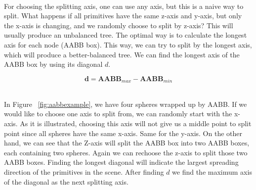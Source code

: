 \documentclass[11pt,a4paper]{article}
\begin{document}
\noindent
\\
For choosing the splitting axis, one can use any axis, but this is a naive way to split. What happens if all primitives have the same z-axis and y-axis, but only the x-axis is changing, and we randomly choose to split by z-axis? This will usually produce an unbalanced tree. The optimal way is to calculate the longest axis for each node (AABB box). This way, we can try to split by the longest axis, which will produce a better-balanced tree. We can find the longest axis of the AABB box by using its diagonal $d$. 


\begin{equation}
\textbf{d} = \textbf{AABB}_{max} - \textbf{AABB}_{min}
\end{equation}

\noindent
\\
In Figure ~\ref{fig:aabbexample}, we have four spheres wrapped up by AABB. If we would like to choose one axis to split from, we can randomly start with the x-axis. As it is illustrated, choosing this axis will not give us a middle point to split point since all spheres have the same x-axis. Same for the y-axis. On the other hand, we can see that the Z-axis will split the AABB box into two AABB boxes, each containing two spheres. Again we can rechoose the z-axis to split those two AABB boxes. Finding the longest diagonal will indicate the largest spreading direction of the primitives in the scene. After finding $d$ we find the maximum axis of the diagonal as the next splitting axis.
\end{document}
